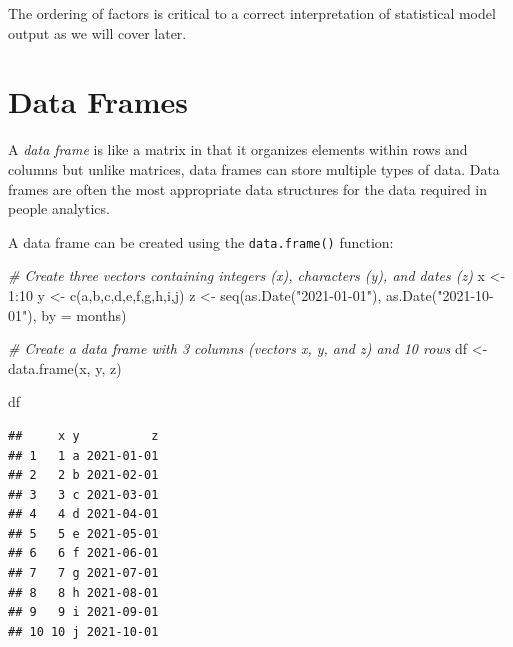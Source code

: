 \documentclass[
]{book}
\newenvironment{Shaded}{\begin{snugshade}}{\end{snugshade}}
\newcommand{\AttributeTok}[1]{\textcolor[rgb]{0.77,0.63,0.00}{#1}}
\newcommand{\CommentTok}[1]{\textcolor[rgb]{0.56,0.35,0.01}{\textit{#1}}}
\newcommand{\DecValTok}[1]{\textcolor[rgb]{0.00,0.00,0.81}{#1}}
\newcommand{\FunctionTok}[1]{\textcolor[rgb]{0.00,0.00,0.00}{#1}}
\newcommand{\NormalTok}[1]{#1}
\newcommand{\OtherTok}[1]{\textcolor[rgb]{0.56,0.35,0.01}{#1}}
\newcommand{\SpecialCharTok}[1]{\textcolor[rgb]{0.00,0.00,0.00}{#1}}
\newcommand{\StringTok}[1]{\textcolor[rgb]{0.31,0.60,0.02}{#1}}
\begin{document}
The ordering of factors is critical to a correct interpretation of statistical model output as we will cover later.

\hypertarget{data-frames}{%
\section{Data Frames}\label{data-frames}}

A \emph{data frame} is like a matrix in that it organizes elements within rows and columns but unlike matrices, data frames can store multiple types of data. Data frames are often the most appropriate data structures for the data required in people analytics.

A data frame can be created using the \texttt{data.frame()} function:

\begin{Shaded}
\begin{Highlighting}[]
\CommentTok{\# Create three vectors containing integers (x), characters (y), and dates (z)}
\NormalTok{x }\OtherTok{\textless{}{-}} \DecValTok{1}\SpecialCharTok{:}\DecValTok{10}
\NormalTok{y }\OtherTok{\textless{}{-}} \FunctionTok{c}\NormalTok{(}\StringTok{\textquotesingle{}a\textquotesingle{}}\NormalTok{,}\StringTok{\textquotesingle{}b\textquotesingle{}}\NormalTok{,}\StringTok{\textquotesingle{}c\textquotesingle{}}\NormalTok{,}\StringTok{\textquotesingle{}d\textquotesingle{}}\NormalTok{,}\StringTok{\textquotesingle{}e\textquotesingle{}}\NormalTok{,}\StringTok{\textquotesingle{}f\textquotesingle{}}\NormalTok{,}\StringTok{\textquotesingle{}g\textquotesingle{}}\NormalTok{,}\StringTok{\textquotesingle{}h\textquotesingle{}}\NormalTok{,}\StringTok{\textquotesingle{}i\textquotesingle{}}\NormalTok{,}\StringTok{\textquotesingle{}j\textquotesingle{}}\NormalTok{)}
\NormalTok{z }\OtherTok{\textless{}{-}} \FunctionTok{seq}\NormalTok{(}\FunctionTok{as.Date}\NormalTok{(}\StringTok{"2021{-}01{-}01"}\NormalTok{), }\FunctionTok{as.Date}\NormalTok{(}\StringTok{"2021{-}10{-}01"}\NormalTok{), }\AttributeTok{by =} \StringTok{\textquotesingle{}months\textquotesingle{}}\NormalTok{)}

\CommentTok{\# Create a data frame with 3 columns (vectors x, y, and z) and 10 rows}
\NormalTok{df }\OtherTok{\textless{}{-}} \FunctionTok{data.frame}\NormalTok{(x, y, z)}

\NormalTok{df}
\end{Highlighting}
\end{Shaded}

\begin{verbatim}
##     x y          z
## 1   1 a 2021-01-01
## 2   2 b 2021-02-01
## 3   3 c 2021-03-01
## 4   4 d 2021-04-01
## 5   5 e 2021-05-01
## 6   6 f 2021-06-01
## 7   7 g 2021-07-01
## 8   8 h 2021-08-01
## 9   9 i 2021-09-01
## 10 10 j 2021-10-01
\end{verbatim}
\end{document}
